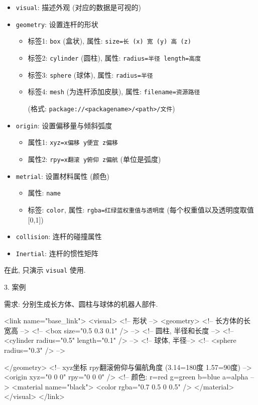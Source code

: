 \documentclass[openany, fontset=windowsold]{ctexbook}
\theoremstyle{kaiti}
\theoremstyle{normal}
\begin{document}
\begin{itemize}
  \item \verb|visual|: 描述外观 (对应的数据是可视的)
  \item \verb|geometry|: 设置连杆的形状
  \begin{itemize}
    \item 标签1: \verb|box| (盒状), 属性: \verb|size=长 (x) 宽 (y) 高 (z)|
    \item 标签2: \verb|cylinder| (圆柱), 属性: \verb|radius=半径 length=高度|
    \item 标签3: \verb|sphere| (球体), 属性: \verb|radius=半径|
    \item 标签4: \verb|mesh| (为连杆添加皮肤), 属性: \verb|filename=资源路径| 
    
    (格式: \verb|package://<packagename>/<path>/文件|)
  \end{itemize}
  \item \verb|origin|: 设置偏移量与倾斜弧度
  \begin{itemize}
    \item 属性1: \verb|xyz=x偏移 y便宜 z偏移|
    \item 属性2: \verb|rpy=x翻滚 y俯仰 z偏航| (单位是弧度)
  \end{itemize}
  \item \verb|metrial|: 设置材料属性 (颜色)
  \begin{itemize}
    \item 属性: \verb|name|
    \item 标签: \verb|color|, 属性: \verb|rgba=红绿蓝权重值与透明度| (每个权重值以及透明度取值[0,1])
  \end{itemize}
  \item \verb|collision|: 连杆的碰撞属性
  \item \verb|Inertial|: 连杆的惯性矩阵
\end{itemize}

在此, 只演示 \verb|visual| 使用.

3. 案例

需求: 分别生成长方体、圆柱与球体的机器人部件.

\begin{xml}
  <link name="base_link">
      <visual>
          <!-- 形状 -->
          <geometry>
              <!-- 长方体的长宽高 -->
              <!-- <box size="0.5 0.3 0.1" /> -->
              <!-- 圆柱, 半径和长度 -->
              <!-- <cylinder radius="0.5" length="0.1" /> -->
              <!-- 球体, 半径-->
              <!-- <sphere radius="0.3" /> -->

          </geometry>
          <!-- xyz坐标 rpy翻滚俯仰与偏航角度 (3.14=180度 1.57=90度) -->
          <origin xyz="0 0 0" rpy="0 0 0" />
          <!-- 颜色: r=red g=green b=blue a=alpha -->
          <material name="black">
              <color rgba="0.7 0.5 0 0.5" />
          </material>
      </visual>
  </link>
\end{xml}
\end{document}

